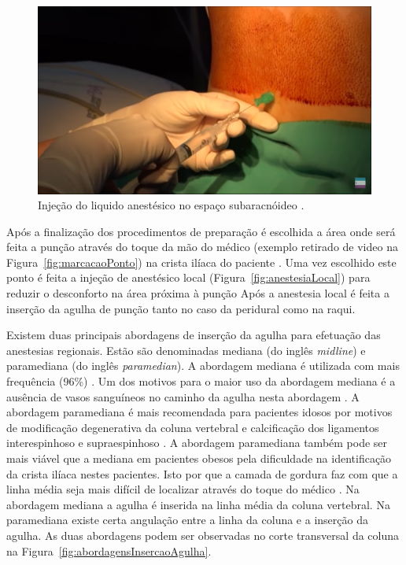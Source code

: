 \begin{figure}[ht!]
    \centering
    \includegraphics[width=0.6\linewidth]{capitulos/figuras/4.InjecaoAnestesico.png}
    \caption{Injeção do liquido anestésico no espaço subaracnóideo  \cite{Londero2018}.}
    \label{fig:injecaoAnestesico}
\end{figure}

Após a finalização dos procedimentos de preparação é escolhida a área onde será feita a punção através do toque da mão do médico (exemplo retirado de video na Figura~\ref{fig:marcacaoPonto}) na crista ilíaca do paciente \cite{Helayel2010,Isaacs2015}. Uma vez escolhido este ponto é feita a injeção de anestésico local (Figura~\ref{fig:anestesiaLocal}) para reduzir o desconforto na área próxima à punção \cite{Sedicias2018} Após a anestesia local é feita a inserção da agulha de punção tanto no caso da peridural como na raqui.

Existem duas principais abordagens de inserção da agulha para efetuação das anestesias regionais. Estão são denominadas mediana (do inglês \textit{midline}) e paramediana (do inglês \textit{paramedian}). A abordagem mediana é utilizada com mais frequência (96\%) \cite{Wantman2006}. Um dos motivos para o maior uso da abordagem mediana é a ausência de vasos sanguíneos no caminho da agulha nesta abordagem \cite{Bapat2015}. A abordagem paramediana é mais recomendada para pacientes idosos \cite{Ahsan-ul-Haq2005} por motivos de modificação degenerativa da coluna vertebral \cite{Boon2003} e calcificação dos ligamentos interespinhoso e supraespinhoso \cite{Wantman2006}. A abordagem paramediana também pode ser mais viável que a mediana em pacientes obesos pela dificuldade na identificação da crista ilíaca nestes pacientes. Isto por que a camada de gordura faz com que a linha média seja mais difícil de localizar através do toque do médico \cite{N.2013}. Na abordagem mediana a agulha é inserida na linha média da coluna vertebral. Na paramediana existe certa angulação entre a linha da coluna e a inserção da agulha. As duas abordagens podem ser observadas no corte transversal da coluna na Figura~\ref{fig:abordagensInsercaoAgulha}. 

